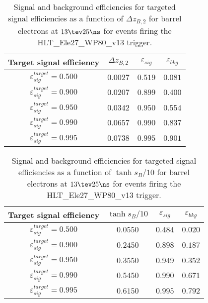 \clearpage

\begin{table}[!bht]
  \begin{center}
    \begin{tabular}{cccc}
      \hline
      Target signal efficiency & $\Delta z_{B,2}$ & $\varepsilon_{sig}$ & $\varepsilon_{bkg}$ \\ 
      \hline
      $\varepsilon_{sig}^{target} = 0.500$ & $  0.0027$ & $0.519$ & $0.081$ \\
      $\varepsilon_{sig}^{target} = 0.900$ & $  0.0207$ & $0.899$ & $0.400$ \\
      $\varepsilon_{sig}^{target} = 0.950$ & $  0.0342$ & $0.950$ & $0.554$ \\
      $\varepsilon_{sig}^{target} = 0.990$ & $  0.0657$ & $0.990$ & $0.837$ \\
      $\varepsilon_{sig}^{target} = 0.995$ & $  0.0738$ & $0.995$ & $0.901$ \\
      \hline
    \end{tabular}
    \caption{Signal and background efficiencies for targeted signal efficiencies as a function of $\Delta z_{B,2}$ for barrel electrons at $13\tev 25\ns$ for events firing the HLT\_Ele27\_WP80\_v13 trigger.}
    \label{tab:eff_rej_z2B_beam_13_25_trigger_27_B}
  \end{center}
\end{table}

\clearpage

\begin{table}[!bht]
  \begin{center}
    \begin{tabular}{cccc}
      \hline
      Target signal efficiency & $\tanh{s_B/10}$ & $\varepsilon_{sig}$ & $\varepsilon_{bkg}$ \\ 
      \hline
      $\varepsilon_{sig}^{target} = 0.500$ & $  0.0550$ & $0.484$ & $0.020$ \\
      $\varepsilon_{sig}^{target} = 0.900$ & $  0.2450$ & $0.898$ & $0.187$ \\
      $\varepsilon_{sig}^{target} = 0.950$ & $  0.3550$ & $0.949$ & $0.352$ \\
      $\varepsilon_{sig}^{target} = 0.990$ & $  0.5450$ & $0.990$ & $0.671$ \\
      $\varepsilon_{sig}^{target} = 0.995$ & $  0.6150$ & $0.995$ & $0.792$ \\
      \hline
    \end{tabular}
    \caption{Signal and background efficiencies for targeted signal efficiencies as a function of $\tanh{s_B/10}$ for barrel electrons at $13\tev 25\ns$ for events firing the HLT\_Ele27\_WP80\_v13 trigger.}
    \label{tab:eff_rej_sB_beam_13_25_trigger_27_B}
  \end{center}
\end{table}

